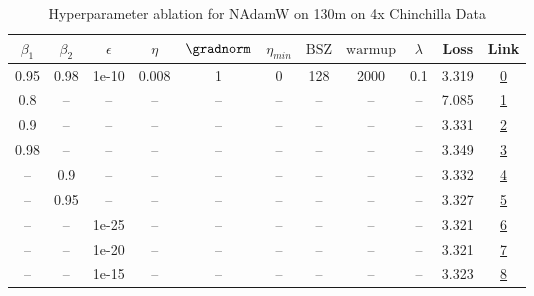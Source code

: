 \begin{table}[H]
\centering
\caption{Hyperparameter ablation for NAdamW on 130m on 4x Chinchilla Data}
\label{tab:ablation_nadamw_130m_on_4x_chinchilla_data}
\begin{tabular}{ccccccccccc}
\toprule
$\beta_1$ & $\beta_2$ & $\epsilon$ & $\eta$ & $\gradnorm$ & $\eta_{min}$ & $\mathrm{BSZ}$ & $\mathrm{warmup}$ & $\lambda$ & Loss & Link \\
\midrule
0.95 & 0.98 & 1e-10 & 0.008 & 1 & 0 & 128 & 2000 & 0.1 & 3.319 & \href{https://wandb.ai/stanford-mercury/optimizer-scaling/runs/sweep-130m-10B-nadamwaee88elr0.008-wd0.1-minlr0-warmup2000-b10.9-75fe1d}{0} \\
\midrule
0.8 & -- & -- & -- & -- & -- & -- & -- & -- & 7.085 & \href{https://wandb.ai/stanford-mercury/optimizer-scaling/runs/sweep-130m-10B-nadamw3ae24elr0.008-wd0.1-minlr0-warmup2000-b10.8-cd4bbc}{1} \\
0.9 & -- & -- & -- & -- & -- & -- & -- & -- & 3.331 & \href{https://wandb.ai/stanford-mercury/optimizer-scaling/runs/sweep-130m-10B-nadamw7ebd66lr0.008-wd0.1-minlr0-warmup2000-b10.9-359641}{2} \\
0.98 & -- & -- & -- & -- & -- & -- & -- & -- & 3.349 & \href{https://wandb.ai/stanford-mercury/optimizer-scaling/runs/sweep-130m-10B-nadamwc3eccalr0.008-wd0.1-minlr0-warmup2000-b10.9-3589de}{3} \\
-- & 0.9 & -- & -- & -- & -- & -- & -- & -- & 3.332 & \href{https://wandb.ai/stanford-mercury/optimizer-scaling/runs/sweep-130m-10B-nadamw0503eblr0.008-wd0.1-minlr0-warmup2000-b10.9-77f1a7}{4} \\
-- & 0.95 & -- & -- & -- & -- & -- & -- & -- & 3.327 & \href{https://wandb.ai/stanford-mercury/optimizer-scaling/runs/sweep-130m-10B-nadamwa45c4blr0.008-wd0.1-minlr0-warmup2000-b10.9-8bcacb}{5} \\
-- & -- & 1e-25 & -- & -- & -- & -- & -- & -- & 3.321 & \href{https://wandb.ai/stanford-mercury/optimizer-scaling/runs/sweep-130m-10B-nadamw23255flr0.008-wd0.1-minlr0-warmup2000-b10.9-5c4387}{6} \\
-- & -- & 1e-20 & -- & -- & -- & -- & -- & -- & 3.321 & \href{https://wandb.ai/stanford-mercury/optimizer-scaling/runs/sweep-130m-10B-nadamweddb28lr0.008-wd0.1-minlr0-warmup2000-b10.9-74d910}{7} \\
-- & -- & 1e-15 & -- & -- & -- & -- & -- & -- & 3.323 & \href{https://wandb.ai/stanford-mercury/optimizer-scaling/runs/sweep-130m-10B-nadamwb0fef6lr0.008-wd0.1-minlr0-warmup2000-b10.9-4497ae}{8} \\

\end{tabular}
\end{table}
